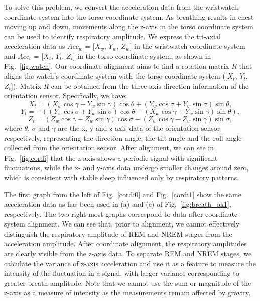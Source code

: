 To solve this problem, we convert the acceleration data from the wristwatch coordinate system into the torso coordinate system. {As breathing results in chest moving up and down, movements along the z-axis in the torso coordinate system can be used to identify respiratory amplitude}. We express the tri-axial acceleration data as $Acc_w$ = [$X_w$, $Y_w$, $Z_w$] in the wristwatch coordinate system and $Acc_t$ = [$X_t$, $Y_t$, $Z_t$] in the torso coordinate system, as shown in Fig.~\ref{fig:watch}.  {Our coordinate alignment aims to find a rotation matrix $R$ that aligns the watch's coordinate system with the torso coordinate system ({[$X_t$, $Y_t$, $Z_t$]}). Matrix $R$ can be obtained from the three-axis direction information of the orientation sensor. Specifically, we have:}
\begin{equation}
      X_t  = (X_w {\cos\gamma} + Y_w{\sin\gamma}){\cos\theta} + (Y_w\cos\sigma + Y_w\sin\sigma)\sin\theta,
\end{equation}
\begin{equation}
      Y_t = -((Y_w\cos\sigma + Y_w\sin\sigma)\cos\theta - (X_w\cos\gamma + Y_w\sin\gamma)\sin\theta),
\end{equation}
\begin{equation}
      Z_t = (Z_w\cos\gamma - Z_w\sin\gamma)\cos\sigma - (Z_w\cos\gamma - Z_w\sin\gamma)\sin\sigma,
\end{equation}
where $\theta$, $\sigma$ and $\gamma$ are the x, y and z axis data of the orientation sensor respectively, representing the direction angle, the tilt angle and the roll angle collected from the orientation sensor. After alignment, we can see in Fig.~\ref{fig:cordi} that the z-axis shows a periodic signal with significant fluctuations, {while the x- and y-axis data undergo smaller changes around zero, which is consistent with stable sleep influenced only by respiratory patterns.}

The first graph from the left of Fig.~\ref{cordi0} and Fig.~\ref{cordi1} show the same acceleration data as has been used in (a) and (c) of
Fig.~\ref{fig:breath_ok1}, respectively. The two right-most graphs correspond to data after coordinate system alignment.  We can see that,
prior to alignment, we cannot effectively distinguish the respiratory amplitude of REM and NREM stages from the acceleration amplitude.
After coordinate alignment, the respiratory amplitudes are clearly visible from the z-axis data. {To separate REM and NREM stages,} we
calculate the variance of z-axis acceleration and use it as a feature to measure the intensity of the fluctuation in a signal, with larger
variance corresponding to greater breath amplitude. Note that we cannot use the sum or magnitude of the z-axis as a measure of intensity as
the measurements remain affected by gravity.

